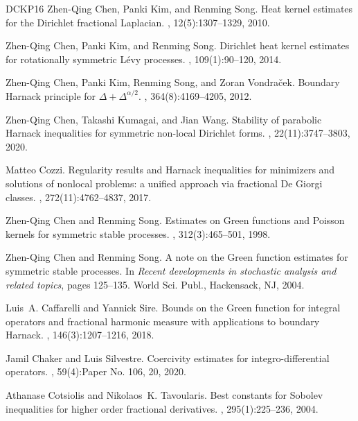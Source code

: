 \documentclass[reqno]{amsart}
\theoremstyle{plain}
\theoremstyle{definition}
\numberwithin{equation}{section}
\begin{document}
\begin{thebibliography}{DCKP16}
	Zhen-Qing Chen, Panki Kim, and Renming Song.
	\newblock Heat kernel estimates for the {D}irichlet fractional {L}aplacian.
	, 12(5):1307--1329, 2010.
	
	Zhen-Qing Chen, Panki Kim, and Renming Song.
	\newblock Dirichlet heat kernel estimates for rotationally symmetric {L}\'{e}vy
	processes.
	, 109(1):90--120, 2014.
	
	Zhen-Qing Chen, Panki Kim, Renming Song, and Zoran Vondra\v{c}ek.
	\newblock Boundary {H}arnack principle for {$\Delta+\Delta^{\alpha/2}$}.
	, 364(8):4169--4205, 2012.
	
	Zhen-Qing Chen, Takashi Kumagai, and Jian Wang.
	\newblock Stability of parabolic {H}arnack inequalities for symmetric non-local
	{D}irichlet forms.
	, 22(11):3747--3803, 2020.
	
	Matteo Cozzi.
	\newblock Regularity results and {H}arnack inequalities for minimizers and
	solutions of nonlocal problems: a unified approach via fractional {D}e
	{G}iorgi classes.
	, 272(11):4762--4837, 2017.
	
	Zhen-Qing Chen and Renming Song.
	\newblock Estimates on {G}reen functions and {P}oisson kernels for symmetric
	stable processes.
	, 312(3):465--501, 1998.
	
	Zhen-Qing Chen and Renming Song.
	\newblock A note on the {G}reen function estimates for symmetric stable
  processes.
	\newblock In {\em Recent developments in stochastic analysis and related
  topics}, pages 125--135. World Sci. Publ., Hackensack, NJ, 2004.
	
	Luis~A. Caffarelli and Yannick Sire.
	\newblock Bounds on the {G}reen function for integral operators and fractional
	harmonic measure with applications to boundary {H}arnack.
	, 146(3):1207--1216, 2018.
	
	Jamil Chaker and Luis Silvestre.
	\newblock Coercivity estimates for integro-differential operators.
	, 59(4):Paper No. 106,
	20, 2020.
	
	Athanase Cotsiolis and Nikolaos~K. Tavoularis.
	\newblock Best constants for {S}obolev inequalities for higher order fractional
	derivatives.
	, 295(1):225--236, 2004.
	

\end{thebibliography}
\end{document}
